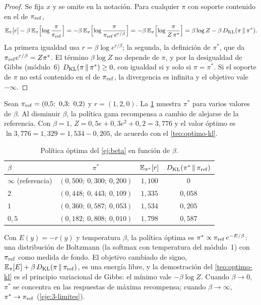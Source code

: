 \begin{proof}
Se fija $x$ y se omite en la notación. Para cualquier $\pi$ con soporte contenido en el de $\pi_{\mathrm{ref}}$,
\[
\mathbb{E}_\pi[r]-\beta\,\mathbb{E}_\pi\Bigl[\log\frac{\pi}{\pi_{\mathrm{ref}}}\Bigr]
=-\beta\,\mathbb{E}_\pi\Bigl[\log\frac{\pi}{\pi_{\mathrm{ref}}\,e^{r/\beta}}\Bigr]
=-\beta\,\mathbb{E}_\pi\Bigl[\log\frac{\pi}{Z\,\pi^{*}}\Bigr]
=\beta\log Z-\beta\,D_{\mathrm{KL}}(\pi\,\|\,\pi^{*}).
\]
La primera igualdad usa $r=\beta\log e^{r/\beta}$; la segunda, la definición de $\pi^{*}$, que da $\pi_{\mathrm{ref}} e^{r/\beta}=Z\pi^{*}$. El término $\beta\log Z$ no depende de $\pi$, y por la desigualdad de Gibbs (módulo~6) $D_{\mathrm{KL}}(\pi\,\|\,\pi^{*})\ge 0$, con igualdad si y solo si $\pi=\pi^{*}$. Si el soporte de $\pi$ no está contenido en el de $\pi_{\mathrm{ref}}$, la divergencia es infinita y el objetivo vale $-\infty$.
\end{proof}

\begin{ejemplo}\label{ej:beta}
Sean $\pi_{\mathrm{ref}}=(0{,}5;\ 0{,}3;\ 0{,}2)$ y $r=(1,2,0)$. La \cref{tab:beta} muestra $\pi^{*}$ para varios valores de $\beta$. Al disminuir $\beta$, la política gana recompensa a cambio de alejarse de la referencia. Con $\beta=1$, $Z=0{,}5e+0{,}3e^{2}+0{,}2=3{,}776$ y el valor óptimo es $\ln 3{,}776=1{,}329=1{,}534-0{,}205$, de acuerdo con el \cref{teo:optimo-kl}.
\end{ejemplo}

\begin{table}[h]
\centering\small
\begin{tabular}{@{}lccc@{}}
\toprule
$\beta$ & $\pi^{*}$ & $\mathbb{E}_{\pi^{*}}[r]$ & $D_{\mathrm{KL}}(\pi^{*}\,\|\,\pi_{\mathrm{ref}})$ \\
\midrule
$\infty$ (referencia) & $(0{,}500;\ 0{,}300;\ 0{,}200)$ & $1{,}100$ & $0$ \\
$2$ & $(0{,}448;\ 0{,}443;\ 0{,}109)$ & $1{,}335$ & $0{,}058$ \\
$1$ & $(0{,}360;\ 0{,}587;\ 0{,}053)$ & $1{,}534$ & $0{,}205$ \\
$0{,}5$ & $(0{,}182;\ 0{,}808;\ 0{,}010)$ & $1{,}798$ & $0{,}587$ \\
\bottomrule
\end{tabular}
\caption{Política óptima del \cref{ej:beta} en función de $\beta$.}
\label{tab:beta}
\end{table}

\begin{observacion}\label{obs:boltzmann}
Con $E(y)=-r(y)$ y temperatura $\beta$, la política óptima es $\pi^{*}\propto\pi_{\mathrm{ref}}\,e^{-E/\beta}$: una distribución de Boltzmann (la softmax con temperatura del módulo~1) con $\pi_{\mathrm{ref}}$ como medida de fondo. El objetivo cambiado de signo, $\mathbb{E}_\pi[E]+\beta\,D_{\mathrm{KL}}(\pi\,\|\,\pi_{\mathrm{ref}})$, es una energía libre, y la demostración del \cref{teo:optimo-kl} es el principio variacional de Gibbs: el mínimo vale $-\beta\log Z$. Cuando $\beta\to 0$, $\pi^{*}$ se concentra en las respuestas de máxima recompensa; cuando $\beta\to\infty$, $\pi^{*}\to\pi_{\mathrm{ref}}$ (\cref{eje:3-limites}).
\end{observacion}

